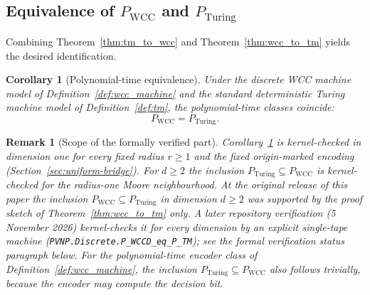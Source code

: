 \documentclass[12pt]{article}
\newtheorem{corollary}[theorem]{Corollary}
\newtheorem{remark}[theorem]{Remark}
\begin{document}
\subsection{Equivalence of $P_{\mathrm{WCC}}$ and $P_{\mathrm{Turing}}$}

Combining Theorem~\ref{thm:tm_to_wcc} and Theorem~\ref{thm:wcc_to_tm} yields
the desired identification.

\begin{corollary}[Polynomial-time equivalence]
\label{cor:pwcc_equals_pturing}
Under the discrete WCC machine model of Definition~\ref{def:wcc_machine} and the
standard deterministic Turing machine model of Definition~\ref{def:tm}, the
polynomial-time classes coincide:
\[
P_{\mathrm{WCC}} = P_{\mathrm{Turing}}.
\]
\end{corollary}

\begin{remark}[Scope of the formally verified part]
\label{rem:verified-scope}
Corollary~\ref{cor:pwcc_equals_pturing} is kernel-checked in dimension
one for every fixed radius $r\ge1$ and the fixed origin-marked encoding
(Section~\ref{sec:uniform-bridge}). For $d\ge2$ the inclusion
$P_{\mathrm{Turing}}\subseteq P_{\mathrm{WCC}}$ is kernel-checked for the
radius-one Moore neighbourhood. At the original release of this paper the
inclusion $P_{\mathrm{WCC}}\subseteq P_{\mathrm{Turing}}$ in dimension
$d\ge2$ was supported by the proof sketch of Theorem~\ref{thm:wcc_to_tm}
only. A later repository verification (5 November 2026) kernel-checks it
for every dimension by an explicit single-tape machine
(\nolinkurl{PVNP.Discrete.P_WCCD_eq_P_TM}); see the formal verification
status paragraph below. For the polynomial-time encoder class
of Definition~\ref{def:wcc_machine}, the inclusion
$P_{\mathrm{Turing}}\subseteq P_{\mathrm{WCC}}$ also follows trivially,
because the encoder may compute the decision bit.
\end{remark}
\end{document}
